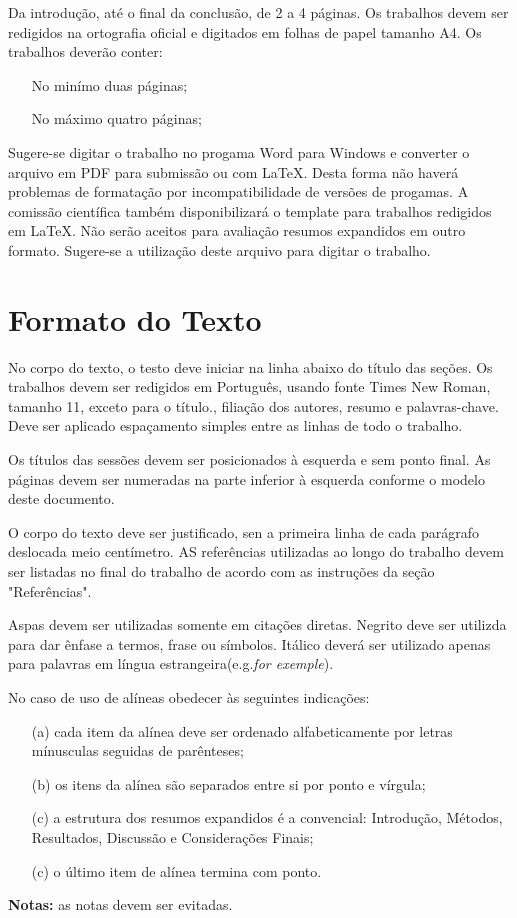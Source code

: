 \documentclass{modelo}
\begin{document}
 Da introdução, até o final da conclusão, de 2 a 4 páginas. Os trabalhos devem ser redigidos na ortografia oficial e digitados em folhas de papel tamanho A4. Os trabalhos deverão conter: 
 \begin{itemize}
     \item[No minímo] duas páginas; 
      \item[No máximo] quatro páginas;
 \end{itemize}
   Sugere-se digitar o trabalho no progama Word para Windows e converter o arquivo em PDF para submissão ou com \LaTeX. Desta forma não haverá problemas de formatação por incompatibilidade de versões de progamas. A comissão científica também disponibilizará o template para trabalhos redigidos em \LaTeX. Não serão aceitos para avaliação resumos expandidos em outro formato. Sugere-se a utilização deste arquivo para digitar o trabalho. 
   
 \section{Formato do Texto} 
 No corpo do texto, o testo deve iniciar na linha abaixo do título das seções. Os trabalhos devem ser redigidos em Português, usando fonte Times New Roman, tamanho 11, exceto para o título., filiação dos autores, resumo e palavras-chave. Deve ser aplicado espaçamento simples entre as linhas de todo o trabalho.
 
 Os títulos das sessões devem ser posicionados à esquerda e sem ponto final. As páginas devem ser numeradas na parte inferior à esquerda conforme o modelo deste documento.
  
  O corpo do texto deve ser justificado, sen a primeira linha de cada parágrafo deslocada meio centímetro. AS referências utilizadas ao longo do trabalho devem ser listadas no final do trabalho de acordo com as instruções da seção "Referências".
 
 Aspas devem ser utilizadas somente em citações diretas. Negrito deve ser utilizda para dar ênfase a termos, frase ou símbolos. Itálico deverá ser utilizado apenas para palavras em língua estrangeira(e.g.\textit{for exemple}).
 
 No caso de uso de alíneas obedecer às seguintes indicações: 
 
 \begin{itemize}
     \item[(a)] cada item da alínea deve ser ordenado alfabeticamente por letras mínusculas seguidas de parênteses; 
     \item[(b)] os itens da alínea são separados entre si por ponto e vírgula; 
     \item[(c)] a estrutura dos resumos expandidos é a convencial: Introdução, Métodos, Resultados, Discussão e Considerações Finais; 
     \item[(c)] o último item de alínea termina com ponto.
 \end{itemize}
\textbf{Notas:} as notas devem ser evitadas.
 
\end{document}
